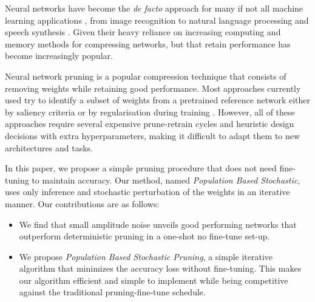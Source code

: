 
    Neural networks have become the \textit{de facto} approach for many if not
    all machine learning applications \cite{lecunDeepLearning2015}, from  image
    recognition \cite{dengImageNetLargescaleHierarchical2009} to natural language
    processing \cite{devlinBERTPretrainingDeep2019} and  
    speech synthesis \cite{oordWaveNetGenerativeModel2016}.
    Given their heavy reliance on increasing computing and memory
    \cite{brownLanguageModelsAre2020,thompsonComputationalLimitsDeep2020}
    methods for compressing networks, but that retain performance has become
    increasingly popular.

Neural network pruning is a popular compression technique that consists of removing weights while retaining good performance.
Most approaches currently used try to identify a subset of weights from a
pretrained reference network either by saliency criteria
\cite{mozerSkeletonizationTechniqueTrimming1988,
hassibiSecondOrderDerivatives1992,lecunOptimalBrainDamage1989} or by
regularisation during training
\cite{chauvinBackPropagationAlgorithmOptimal1988,
carreira-perpinanLearningCompressionAlgorithmsNeural2018}. However, all of these approaches require several expensive prune-retrain cycles and heuristic
design decisions with extra hyperparameters, making it difficult to adapt them
to new architectures and tasks.

In this paper, we propose a simple pruning procedure that does not need
fine-tuning to maintain accuracy. Our method, named \textit{Population Based
            Stochastic}, uses only inference and stochastic perturbation of the weights in an
iterative manner.
Our contributions are as follows:
     \begin{itemize}
         \item We find that small amplitude noise unveils good performing
             networks that outperform deterministic pruning in a one-shot no
             fine-tune set-up.
        \item  We propose  \textit{Population Based
            Stochastic Pruning}, a simple iterative algorithm that minimizes the accuracy loss without
            fine-tuning. This makes our algorithm efficient and simple to
            implement while being competitive against the traditional
            pruning-fine-tune schedule.



     \end{itemize}
     
